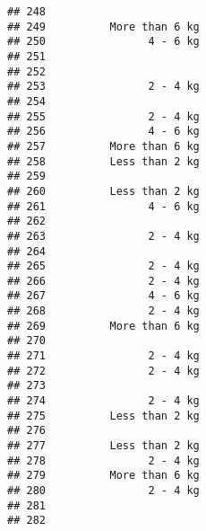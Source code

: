 \documentclass[
]{article}
\begin{document}
\begin{verbatim}
## 248                                                                     
## 249          More than 6 kg                                             
## 250                4 - 6 kg                                             
## 251                                                                     
## 252                                                                     
## 253                2 - 4 kg                                             
## 254                                                                     
## 255                2 - 4 kg                                             
## 256                4 - 6 kg                                             
## 257          More than 6 kg                                             
## 258          Less than 2 kg                                             
## 259                                                                     
## 260          Less than 2 kg                                             
## 261                4 - 6 kg                                             
## 262                                                                     
## 263                2 - 4 kg                                             
## 264                                                                     
## 265                2 - 4 kg                                             
## 266                2 - 4 kg                                             
## 267                4 - 6 kg                                             
## 268                2 - 4 kg                                             
## 269          More than 6 kg                                             
## 270                                                                     
## 271                2 - 4 kg                                             
## 272                2 - 4 kg                                             
## 273                                                                     
## 274                2 - 4 kg                                             
## 275          Less than 2 kg                                             
## 276                                                                     
## 277          Less than 2 kg                                             
## 278                2 - 4 kg                                             
## 279          More than 6 kg                                             
## 280                2 - 4 kg                                             
## 281                                                                     
## 282                                                                     

\end{verbatim}
\end{document}
